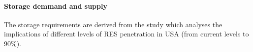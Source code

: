 
\paragraph{Storage demmand and supply}

The storage requirements are derived from the study \cite{NREL2012}  which analyses the implications of different levels of RES penetration in USA (from current levels to 90\%).